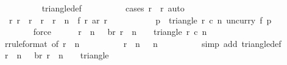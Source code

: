 \begin{isabellebody}
\ \ \ \ \ \ \ \ \isamarkupfalse%
\ triangle{\isacharunderscore}def\isanewline
\ \ \ \ \ \ \ \ \isamarkupfalse%
\ {\isacharparenleft}cases\ {\isachardoublequoteopen}r\ {\isacharequal}\ r{}{\isachardoublequoteclose}{\isacharparenright}\ auto\isanewline
\ \ \ \ \isamarkupfalse%
\isanewline
\ \ \ \ \isamarkupfalse%
\ \isamarkupfalse%
\ {\isachardoublequoteopen}{\isasymforall}\ r{\isachardot}\ r{}\ {\isasymle}\ r\ {\isasymand}\ r\ {\isacharless}\ r{}\ {\isacharplus}\ n\ {\isasymlongrightarrow}\ f\ r\ {\isacharparenleft}ar\ r{\isacharparenright}\ {\isachargreater}\ {}{}{}{}{\isachardoublequoteclose}\isanewline
\ \ \ \ \ \ \isamarkupfalse%
\ {\isacharbackquoteopen}{\isasymforall}\ p\ {\isasymin}\ triangle\ r{}\ c{}\ n{\isachardot}\ {\isacharparenleft}uncurry\ f{\isacharparenright}\ p\ {\isachargreater}\ {}{}{}{}{\isacharbackquoteclose}\isanewline
\ \ \ \ \ \ \isamarkupfalse%
\ force\isanewline
\isanewline
\ \ \ \ \isamarkupfalse%
\ {\isachardoublequoteopen}{\isacharparenleft}r{}\ {\isacharplus}\ n\ {\isacharminus}\ {}{\isacharcomma}\ br\ {\isacharparenleft}r{}\ {\isacharplus}\ n\ {\isacharminus}\ {}{\isacharparenright}{\isacharparenright}\ {\isasymin}\ triangle\ r{}\ c{}\ n{\isachardoublequoteclose}\isanewline
\ \ \ \ \ \ \isamarkupfalse%
\ r{\isacharparenleft}{}{\isacharparenright}{\isacharbrackleft}rule{\isacharunderscore}format{\isacharcomma}\ of\ {\isachardoublequoteopen}r{}\ {\isacharplus}\ n\ {\isacharminus}\ {}{\isachardoublequoteclose}{\isacharbrackright}\isanewline
\ \ \ \ \ \ \isamarkupfalse%
\ {\isacharbackquoteopen}r{}\ {\isacharplus}\ n\ {\isasymle}\ {}{}{}{}{\isacharbackquoteclose}\ {\isacharbackquoteopen}n\ {\isasymge}\ {}{}{}{}{\isacharbackquoteclose}\isanewline
\ \ \ \ \ \ \isamarkupfalse%
\ {\isacharparenleft}simp\ add{\isacharcolon}\ triangle{\isacharunderscore}def{\isacharparenright}\isanewline
\ \ \ \ \isamarkupfalse%
\ {\isachardoublequoteopen}{\isacharparenleft}r{}\ {\isacharplus}\ n\ {\isacharminus}\ {}{\isacharcomma}\ br\ {\isacharparenleft}r{}\ {\isacharplus}\ n\ {\isacharminus}\ {}{\isacharparenright}{\isacharparenright}\ {\isasymin}\ triangle\ {}\ {}\ {}{}{}{}{\isachardoublequoteclose}\isanewline

\end{isabellebody}
